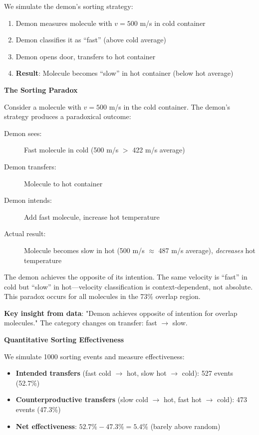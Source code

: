 \documentclass[10pt,twocolumn,letterpaper]{article}
\theoremstyle{definition}
\theoremstyle{remark}
\begin{document}
We simulate the demon's sorting strategy:
\begin{enumerate}
\item Demon measures molecule with $v = 500$ m/s in cold container
\item Demon classifies it as ``fast'' (above cold average)
\item Demon opens door, transfers to hot container
\item \textbf{Result}: Molecule becomes ``slow'' in hot container (below hot average)
\end{enumerate}

\textbf{The Sorting Paradox}

Consider a molecule with $v = 500$ m/s in the cold container. The demon's strategy produces a paradoxical outcome:

\begin{description}
\item[Demon sees:] Fast molecule in cold (500 m/s $>$ 422 m/s average)
\item[Demon transfers:] Molecule to hot container
\item[Demon intends:] Add fast molecule, increase hot temperature
\item[Actual result:] Molecule becomes slow in hot (500 m/s $ \approx $ 487 m/s average), \textit{decreases} hot temperature
\end{description}

The demon achieves the opposite of its intention. The same velocity is ``fast'' in cold but ``slow'' in hot—velocity classification is context-dependent, not absolute. This paradox occurs for all molecules in the 73\% overlap region.

\textbf{Key insight from data}: "Demon achieves opposite of intention for overlap molecules." The category changes on transfer: fast $\to$ slow.

\textbf{Quantitative Sorting Effectiveness}

We simulate 1000 sorting events and measure effectiveness:
\begin{itemize}
\item \textbf{Intended transfers} (fast cold $\to$ hot, slow hot $\to$ cold): 527 events (52.7\%)
\item \textbf{Counterproductive transfers} (slow cold $\to$ hot, fast hot $\to$ cold): 473 events (47.3\%)
\item \textbf{Net effectiveness}: $52.7\% - 47.3\% = 5.4\%$ (barely above random)
\end{itemize}
\end{document}
